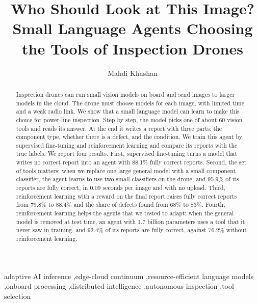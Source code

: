 \documentclass[final,5p,times,twocolumn]{elsarticle}
\begin{document}
\begin{frontmatter}

\title{\fontsize{24}{29}\selectfont Who Should Look at This Image? Small Language Agents Choosing the Tools of Inspection Drones}

\author{Mahdi Khashan}

\begin{abstract}
Inspection drones can run small vision models on board and send images to larger models in the cloud. The drone must choose models for each image, with limited time and a weak radio link. We show that a small language model can learn to make this choice for power-line inspection. Step by step, the model picks one of about 60 vision tools and reads its answer. At the end it writes a report with three parts: the component type, whether there is a defect, and the condition. We train this agent by supervised fine-tuning and reinforcement learning and compare its reports with the true labels. We report four results. First, supervised fine-tuning turns a model that writes no correct report into an agent with 88.1\% fully correct reports. Second, the set of tools matters: when we replace one large general model with a small component classifier, the agent learns to use two small classifiers on the drone, and 95.9\% of its reports are fully correct, in 0.09 seconds per image and with no upload. Third, reinforcement learning with a reward on the final report raises fully correct reports from 79.8\% to 88.4\% and the share of defects found from 68\% to 83\%. Fourth, reinforcement learning helps the agents that we tested to adapt: when the general model is removed at test time, an agent with 1.7 billion parameters uses a tool that it never saw in training, and 92.4\% of its reports are fully correct, against 76.2\% without reinforcement learning.
\end{abstract}

\begin{keyword}
adaptive AI inference \sep edge-cloud continuum \sep resource-efficient language models \sep onboard processing \sep distributed intelligence \sep autonomous inspection \sep tool selection
\end{keyword}

\end{frontmatter}

\pagestyle{preprint}
\end{document}

